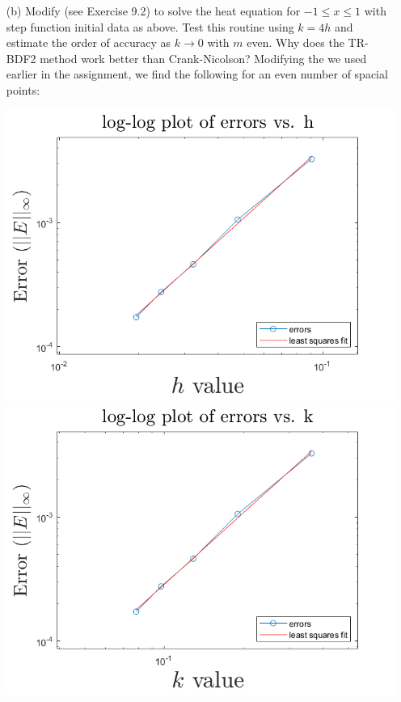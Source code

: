 \documentclass{article}
\begin{document}
\begin{itemize}
\begin{itemize}
    \end{itemize}
    \item[(b)] Modify  (see Exercise 9.2) to solve the heat equation for $-1 \leq x \leq 1$ with step function initial data as above. Test this routine using $k = 4h$ and estimate the order of accuracy as $k \to 0$ with $m$ even. Why does the TR-BDF2 method work better than Crank-Nicolson?
    \newline\newline
    Modifying the  we used earlier in the assignment, we find the following for an even number of spacial points:
    \begin{center}
        \includegraphics[scale = 0.4]{trbdferrGauss.png}
        \includegraphics[scale = 0.4]{kerrTRBDF2Gauss.png}

\end{center}
\end{itemize}
\end{document}
